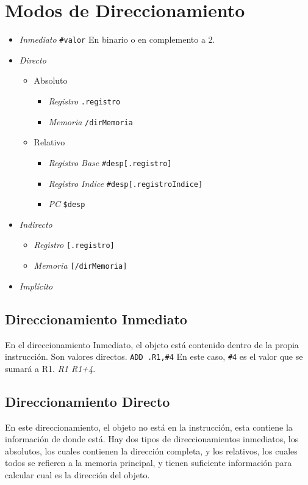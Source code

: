 \documentclass[a4paper,11pt,spanish]{report}
\begin{document}
\section{Modos de Direccionamiento}
\begin{itemize}
\item \emph{Inmediato} \verb|#valor| \textrightarrow En binario o en complemento a 2.
\item \emph{Directo} 
	\begin{itemize}
	\item Absoluto
		\begin{itemize}
		\item \emph{Registro} \verb|.registro|
		\item \emph{Memoria} \verb|/dirMemoria|
		\end{itemize}
	\item Relativo
		\begin{itemize}
		\item \emph{Registro Base} \verb|#desp[.registro]|
		\item \emph{Registro Indice} \verb|#desp[.registroIndice]|
		\item \emph{PC} \verb|$desp|
		\end{itemize}
	\end{itemize}
\item \emph{Indirecto}
	\begin{itemize}
	\item \emph{Registro} \verb|[.registro]|
	\item \emph{Memoria} \verb|[/dirMemoria]|
	\end{itemize}
\item \emph{Implícito}
\end{itemize}
\subsection{Direccionamiento Inmediato}
En el direccionamiento Inmediato, el objeto está contenido dentro de la propia instrucción. Son valores directos. \verb|ADD .R1,#4| En este caso, \verb|#4| es el valor que se sumará a R1.  \emph{R1 \textleftarrow R1+4}.
\subsection{Direccionamiento Directo}
En este direccionamiento, el objeto no está en la instrucción, esta contiene la información de donde está. Hay dos tipos de direccionamientos inmediatos, los absolutos, los cuales contienen la dirección completa, y los relativos, los cuales todos se refieren a la memoria principal, y tienen suficiente información para calcular cual es la dirección del objeto.
\end{document}
